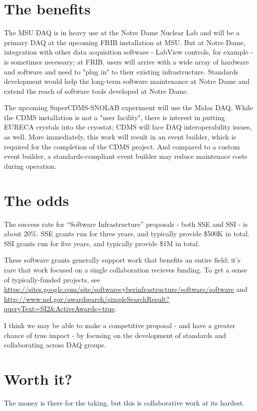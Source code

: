\documentclass[]{report}   %
\begin{document}
\section*{The benefits}
The MSU DAQ is in heavy use at the Notre Dame Nuclear Lab and will be a primary DAQ at the upcoming FRIB installation at MSU.  But at Notre Dame, integration with other data acquisition software - LabView controls, for example - is sometimes necessary; at FRIB, users will arrive with a wide array of hardware and software and need to "plug in" to their existing infrastructure.  Standards development would help the long-term software maintenance at Notre Dame and extend the reach of software tools developed at Notre Dame.   

The upcoming SuperCDMS-SNOLAB experiment will use the Midas DAQ.  While the CDMS installation is not a "user facility", there is interest in putting EURECA crystals into the cryostat; CDMS will face DAQ interoperability issues, as well.  More immediately, this work will result in an event builder, which is required for the completion of the CDMS project.  And compared to a custom event builder, a standards-compliant event builder may reduce maintenace costs during operation.


\section*{The odds}     %
The success rate for ``Software Infrastructure'' proposals - both SSE and SSI - is about 20\%. SSE grants run for three years, and typically
provide \$500K in total. SSI grants run for five years, and typically provide \$1M
in total.
 
These software grants generally support work that benefits
an entire field; it's rare that work focused on a single collaboration recieves
funding. To get a sense of typically-funded projects, see
\url{https://sites.google.com/site/softwarecyberinfrastructure/software/software} and
\url{http://www.nsf.gov/awardsearch/simpleSearchResult?queryText=SI2&ActiveAwards=true}.
 
I think we may be able to make a competitive proposal - and have a greater chance of true impact - by focusing on the development of standards and collaborating across DAQ groups.

 
\section*{Worth it?}     %
The money is there for the taking, but this is collaborative work at its hardest.  
\end{document}

